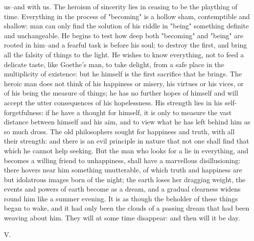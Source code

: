 us--and with us. The heroism of sincerity lies in ceasing to be the
plaything of time. Everything in the process of "becoming" is a
hollow sham, contemptible and shallow: man can only find the solution
of his riddle in "being" something definite and unchangeable. He
begins to test how deep both "becoming" and "being" are rooted in
him--and a fearful task is before his soul; to destroy the first, and
bring all the falsity of things to the light. He wishes to know
everything, not to feed a delicate taste, like Goethe's man, to take
delight, from a safe place in the multiplicity of existence: but he
himself is the first sacrifice that he brings. The heroic man does
not think of his happiness or misery, his virtues or his vices, or of
his being the measure of things; he has no further hopes of himself
and will accept the utter consequences of his hopelessness. His
strength lies in his self-forgetfulness: if he have a thought for
himself, it is only to measure the vast distance between himself and
his aim, and to view what he has left behind him as so much dross.
The old philosophers sought for happiness and truth, with all their
strength: and there is an evil principle in nature that not one shall
find that which he cannot help seeking. But the man who looks for a
lie in everything, and becomes a willing friend to unhappiness, shall
have a marvellous disillusioning: there hovers near him something
unutterable, of which truth and happiness are but idolatrous images
born of the night; the earth loses her dragging weight, the events
and powers of earth become as a dream, and a gradual clearness widens
round him like a summer evening. It is as though the beholder of
these things began to wake, and it had only been the clouds of a
passing dream that had been weaving about him. They will at some time
disappear: and then will it be day.


V.

